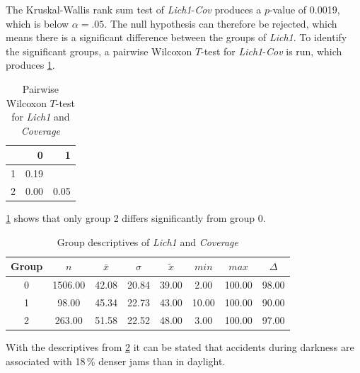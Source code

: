 The Kruskal-Wallis rank sum test of \textit{Lich1}-\textit{Cov} produces a $p$-value of 0.0019, which is below $\alpha=.05$. The null hypothesis can therefore be rejected, which means there is a significant difference between the groups of \textit{Lich1}. To identify the significant groups, a pairwise Wilcoxon $T$-test for \textit{Lich1}-\textit{Cov} is run, which produces \cref{tbl:wilcoxon_baysis_matched_Lich1_Cov}. 
\begin{table}[ht!]
	\tiny
	\centering
    \begin{tabular}{rrr}
        \toprule
        & 0 & 1 \\ 
        \midrule
        1 & 0.19 &  \\ 
        2 & 0.00 & 0.05 \\ 
        \bottomrule
      \end{tabular}
	\caption{Pairwise Wilcoxon $T$-test for \textit{Lich1} and \textit{Coverage}}
	\label{tbl:wilcoxon_baysis_matched_Lich1_Cov}
\end{table}
\cref{tbl:wilcoxon_baysis_matched_Lich1_Cov} shows that only group 2 differs significantly from group 0. 
\begin{table}[ht!]
	\tiny
	\centering
    \begin{tabular}{c|c|c|c|c|c|c|c}
        \toprule
        Group & $n$ & $\bar{x}$ & $\sigma$ & $\tilde{x}$ & $min$ & $max$ & $\Delta$ \\  
        \midrule
        0 & 1506.00 & 42.08 & 20.84 & 39.00 & 2.00 & 100.00 & 98.00 \\ 
        1 & 98.00 & 45.34 & 22.73 & 43.00 & 10.00 & 100.00 & 90.00 \\ 
        2 & 263.00 & 51.58 & 22.52 & 48.00 & 3.00 & 100.00 & 97.00 \\ 
        \bottomrule
      \end{tabular}
	\caption{Group descriptives of \textit{Lich1} and \textit{Coverage}}
	\label{tbl:descriptives_baysis_matched_Lich1_Cov}
\end{table}
With the descriptives from \cref{tbl:descriptives_baysis_matched_Lich1_Cov} it can be stated that accidents during darkness are associated with 18\,\% denser jams than in daylight.

